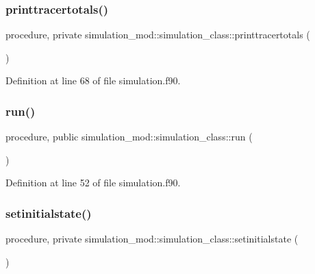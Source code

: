 \subsubsection{\texorpdfstring{printtracertotals()}{printtracertotals()}}
{\footnotesize\ttfamily procedure, private simulation\+\_\+mod\+::simulation\+\_\+class\+::printtracertotals (\begin{DoxyParamCaption}{ }\end{DoxyParamCaption})\hspace{0.3cm}{\ttfamily [private]}}



Definition at line 68 of file simulation.\+f90.

\mbox{\label{structsimulation__mod_1_1simulation__class_a47c2f9dd8a012a523ac88aa8d3c6a911}} 
\subsubsection{\texorpdfstring{run()}{run()}}
{\footnotesize\ttfamily procedure, public simulation\+\_\+mod\+::simulation\+\_\+class\+::run (\begin{DoxyParamCaption}{ }\end{DoxyParamCaption})}



Definition at line 52 of file simulation.\+f90.

\mbox{\label{structsimulation__mod_1_1simulation__class_aeb84b150c76e399c3dc33fbc3f7874ae}} 
\subsubsection{\texorpdfstring{setinitialstate()}{setinitialstate()}}
{\footnotesize\ttfamily procedure, private simulation\+\_\+mod\+::simulation\+\_\+class\+::setinitialstate (\begin{DoxyParamCaption}{ }\end{DoxyParamCaption})\hspace{0.3cm}{\ttfamily [private]}}



